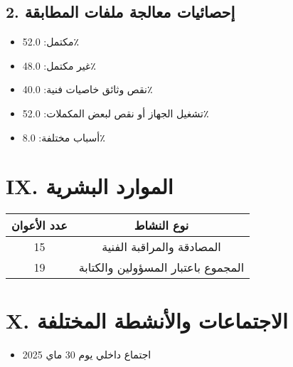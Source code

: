 \documentclass[a4paper,12pt]{article}
\begin{document}
\subsection*{2. إحصائيات معالجة ملفات المطابقة}
\begin{itemize}
    \item مكتمل: 52.0٪
    \item غير مكتمل: 48.0٪
\end{itemize}
\begin{itemize}
    \item نقص وثائق خاصيات فنية: 40.0٪
    \item تشغيل الجهاز أو نقص لبعض المكملات: 52.0٪
    \item أسباب مختلفة: 8.0٪
\end{itemize}

\section*{IX. الموارد البشرية}
\begin{tabular}{cc}
\toprule
\textbf{عدد الأعوان} & \textbf{نوع النشاط} \\
\midrule
15 & المصادقة والمراقبة الفنية \\
19 & المجموع باعتبار المسؤولين والكتابة \\
\bottomrule
\end{tabular}

\section*{X. الاجتماعات والأنشطة المختلفة}
\begin{itemize}
    \item اجتماع داخلي يوم 30 ماي 2025
\end{itemize}
\end{document}
